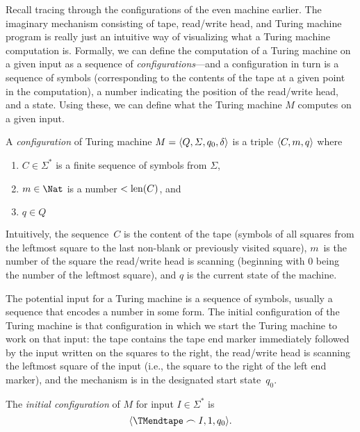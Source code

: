 \documentclass[../../../include/open-logic-section]{subfiles}
\begin{document}

\begin{explain}
Recall tracing through the configurations of the even machine earlier.
The imaginary mechanism consisting of tape, read/write head, and
Turing machine program is really just an intuitive way of visualizing
what a Turing machine computation is.  Formally, we can define the
computation of a Turing machine on a given input as a sequence of
\emph{configurations}---and a configuration in turn is a sequence of
symbols (corresponding to the contents of the tape at a given point in
the computation), a number indicating the position of the read/write
head, and a state.  Using these, we can define what the Turing machine
$M$ computes on a given input.
\end{explain}

\begin{defn}[Configuration]
A \emph{configuration} of Turing machine $M = \langle Q, \Sigma, q_0,
\delta \rangle$ is a triple $\langle C, m, q \rangle$ where
\begin{enumerate}
\item $C \in \Sigma^*$ is a finite sequence of symbols from $\Sigma$,
\item $m \in \Nat$ is a number $< \mathrm{len}(C)$, and
\item $q \in Q$
\end{enumerate}
Intuitively, the sequence~$C$ is the content of the tape (symbols of
all squares from the leftmost square to the last non-blank or
previously visited square), $m$~is the number of the square the
read/write head is scanning (beginning with $0$ being the number of
the leftmost square), and $q$ is the current state of the machine.
\end{defn}

\begin{explain}
The potential input for a Turing machine is a sequence of symbols,
usually a sequence that encodes a number in some form.  The initial
configuration of the Turing machine is that configuration in which we
start the Turing machine to work on that input: the tape contains the
tape end marker immediately followed by the input written on the
squares to the right, the read/write head is scanning the leftmost
square of the input (i.e., the square to the right of the left end
marker), and the mechanism is in the designated start state~$q_0$.
\end{explain}

\begin{defn}
The \emph{initial configuration} of $M$ for input $I \in \Sigma^*$ is
\[
\tuple{\TMendtape \frown I, 1, q_0}.
\]
\end{defn}
\end{document}
